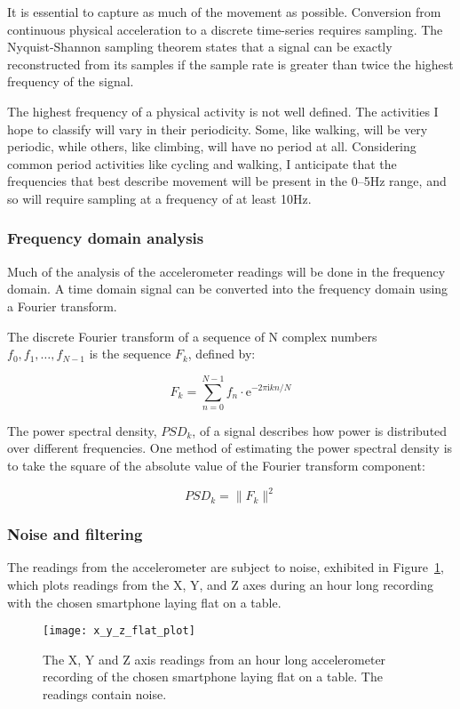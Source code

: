     It is essential to capture as much of the movement as possible. Conversion from continuous 
    physical acceleration to a discrete time-series requires sampling. The Nyquist-Shannon sampling theorem states that a signal can be exactly reconstructed from its samples if the sample rate is greater than twice the highest frequency of the signal.
    
    The highest frequency of a physical activity is not well defined. The activities I hope to classify will vary in their periodicity. Some, like walking, will be very periodic, while others, like climbing, will have no period at all. Considering common period activities like cycling and walking, I anticipate that the frequencies that best describe movement will be present in the 0--5\si{Hz} range, and so will require sampling at a frequency of at least 10\si{Hz}.
    
    \subsubsection{Frequency domain analysis}
      Much of the analysis of the accelerometer readings will be done in the frequency domain. A time domain signal can be converted into the frequency domain using a Fourier transform.
      
      The discrete Fourier transform of a sequence of N complex numbers $f_0, f_1, \ldots, f_{N-1}$ is the sequence $F_k$, defined by:
      
      $$F_k = \sum\limits_{n=0}^{N-1} f_n \cdot \mathrm{e}^{-2\pi \mathrm{i} kn/N}$$
      
      The power spectral density, $PSD_k$, of a signal describes how power is distributed over different frequencies. One method of estimating the power spectral density is to take the square of the absolute value of the Fourier transform component:
      
      $$PSD_k = \|F_k\|^2$$
      
    \subsubsection{Noise and filtering}
      The readings from the accelerometer are subject to noise, exhibited in 
      Figure~\ref{fig:x_y_z_flat_plot}, which plots readings from the X, Y, and Z axes during an hour long recording with the chosen smartphone laying flat on a table.
      
      \begin{figure}
        \centering
        \texttt{[image: x\_y\_z\_flat\_plot]}
        \caption[Noisy readings of the X, Y and Z axes]{The X, Y and Z axis readings from an hour long accelerometer recording of the chosen smartphone laying flat on a table. The readings contain noise.}
        \label{fig:x_y_z_flat_plot}
      \end{figure}
      
